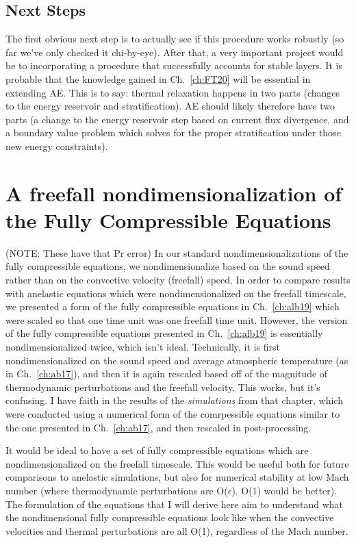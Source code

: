 \subsection{Next Steps}
The first obvious next step is to actually see if this procedure works robustly (so far we've only checked it chi-by-eye).
After that, a very important project would be to incorporating a procedure that successfully accounts for stable layers.
It is probable that the knowledge gained in Ch.~\ref{ch:FT20} will be essential in extending AE.
This is to say: thermal relaxation happens in two parts (changes to the energy reservoir and stratification).
AE should likely therefore have two parts (a change to the energy reservoir step based on current flux divergence, and a boundary value problem which solves for the proper stratification under those new energy constraints).


\section{A freefall nondimensionalization of the Fully Compressible Equations}
(NOTE: These have that Pr error)
In our standard nondimensionalizations of the fully compressible equations, we nondimensionalize based on the sound speed rather than on the convective velocity (freefall) speed.
In order to compare results with anelastic equations which were nondimensionalized on the freefall timescale, we presented a form of the fully compressible equations in Ch.~\ref{ch:alb19} which were scaled so that one time unit was one freefall time unit. 
However, the version of the fully compressible equations presented in Ch.~\ref{ch:alb19} is essentially nondimensionalized twice, which isn't ideal.
Technically, it is first nondimensionalized on the sound speed and average atmospheric temperature (as in Ch.~\ref{ch:ab17}), and then it is again rescaled based off of the magnitude of thermodynamic perturbations and the freefall velocity.
This works, but it's confusing.
I have faith in the results of the \emph{simulations} from that chapter, which were conducted using a numerical form of the comrpessible equations similar to the one presented in Ch.~\ref{ch:ab17}, and then rescaled in post-processing.

It would be ideal to have a set of fully compressible equations which are nondimensionalized on the freefall timescale.
This would be useful both for future comparisons to anelastic simulations, but also for numerical stability at low Mach number (where thermodynamic perturbations are O($\epsilon$). O(1) would be better). 
The formulation of the equations that I will derive here aim to understand what the nondimensional fully compressible equations look like when the convective velocities and thermal perturbations are all O(1), regardless of the Mach number.

